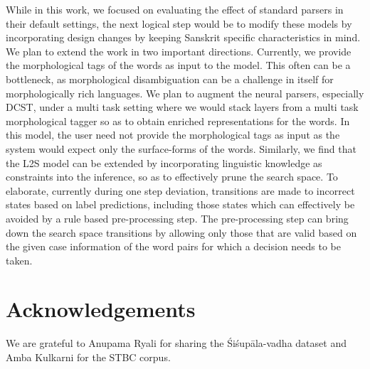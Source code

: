 \documentclass[11pt]{article}
\begin{document}
While in this work, we focused on evaluating the effect of standard parsers in their default settings, the next logical step would be to modify these models by incorporating design changes by keeping Sanskrit specific characteristics in mind. We plan to extend the work in two important directions. Currently, we provide the morphological tags of the words as input to the model. This often can be a bottleneck, as morphological disambiguation can be a challenge in itself for morphologically rich languages.  We plan to augment the neural parsers, especially DCST, under a multi task setting where we would stack layers from a multi task morphological tagger so as to obtain enriched representations for the words. In this model, the user need not provide the morphological tags as input as the system would expect only the surface-forms of the words. Similarly, we find that the L2S model can be extended by incorporating linguistic knowledge as constraints into the inference, so as to effectively prune the search space. To elaborate, currently during one step deviation, transitions are made to incorrect states based on label predictions, including those states which can  effectively be avoided by a rule based pre-processing step. The pre-processing step can bring down the search space transitions by allowing only those that are valid based on the given case information of the word pairs for which a decision needs to be taken.





\section*{Acknowledgements}

We are grateful to  Anupama Ryali for sharing the Śiśupāla-vadha dataset and Amba Kulkarni for the STBC corpus.





\end{document}
